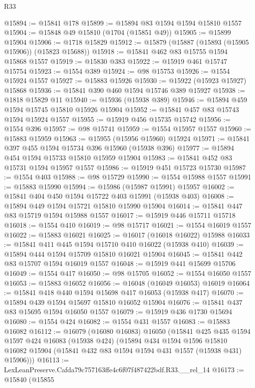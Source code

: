 \begin{lexlean}{R33}
\begin{coremodule}
@15894 := @15841 @178
@15899 := @15894 @83 @1594 @1594 @15810 @1557
@15904 := @15848 @49 @15810 (@1704 (@15851 @49))
@15905 := @15899 @15904
@15906 := @1718 @15829
@15912 := @15879 (@15887 (@15893 (@15905 @15906)) (@15823 @15688))
@15918 := @15841 @462 @83 @15755 @1594 @15868 @1557
@15919 := @15830 @383
@15922 := @15919 @461 @15747 @15754
@15923 := @1554 @389
@15924 := @98 @15753
@15926 := @1554 @15924 @1557
@15927 := @15883 @15926
@15930 := @15922 (@15923 @15927) @15868
@15936 := @15841 @390 @460 @1594 @15746 @389 @15927
@15938 := @1818 @15829 @11
@15940 := @15936 (@15938 @389)
@15946 := @15894 @459 @1594 @15745 @15810 @15926 @15904
@15952 := @15841 @457 @83 @15743 @1594 @15924 @1557
@15955 := @15919 @456 @15735 @15742
@15956 := @1554 @396
@15957 := @98 @15741
@15959 := @1554 @15957 @1557
@15960 := @15883 @15959
@15963 := @15955 (@15956 @15960) @15924
@15971 := @15841 @397 @455 @1594 @15734 @396 @15960 (@15938 @396)
@15977 := @15894 @454 @1594 @15733 @15810 @15959 @15904
@15983 := @15841 @452 @83 @15731 @1594 @15957 @1557
@15986 := @15919 @451 @15723 @15730
@15987 := @1554 @403
@15988 := @98 @15729
@15990 := @1554 @15988 @1557
@15991 := @15883 @15990
@15994 := @15986 (@15987 @15991) @15957
@16002 := @15841 @404 @450 @1594 @15722 @403 @15991 (@15938 @403)
@16008 := @15894 @449 @1594 @15721 @15810 @15990 @15904
@16014 := @15841 @447 @83 @15719 @1594 @15988 @1557
@16017 := @15919 @446 @15711 @15718
@16018 := @1554 @410
@16019 := @98 @15717
@16021 := @1554 @16019 @1557
@16022 := @15883 @16021
@16025 := @16017 (@16018 @16022) @15988
@16033 := @15841 @411 @445 @1594 @15710 @410 @16022 (@15938 @410)
@16039 := @15894 @444 @1594 @15709 @15810 @16021 @15904
@16045 := @15841 @442 @83 @15707 @1594 @16019 @1557
@16048 := @15919 @441 @15699 @15706
@16049 := @1554 @417
@16050 := @98 @15705
@16052 := @1554 @16050 @1557
@16053 := @15883 @16052
@16056 := @16048 (@16049 @16053) @16019
@16064 := @15841 @418 @440 @1594 @15698 @417 @16053 (@15938 @417)
@16070 := @15894 @439 @1594 @15697 @15810 @16052 @15904
@16076 := @15841 @437 @83 @15695 @1594 @16050 @1557
@16079 := @15919 @436 @1730 @15694
@16080 := @1554 @424
@16082 := @1554 @431 @1557
@16083 := @15883 @16082
@16112 := @16079
    (@16080 @16083)
    @16050
    (@15841
      @425
      @435
      @1594
      @1597
      @424
      @16083
      (@15938 @424)
      (@15894
        @434
        @1594
        @1596
        @15810
        @16082
        @15904
        (@15841 @432 @83 @1594 @1594 @431 @1557 (@15938 @431) @15906)))
@16113 := LexLeanPreserve.Cafda79c757163ffe4c6f07f487422bdf.R33.__rel_14
@16173 := @15840
    (@15855

\end{coremodule}
\end{lexlean}
